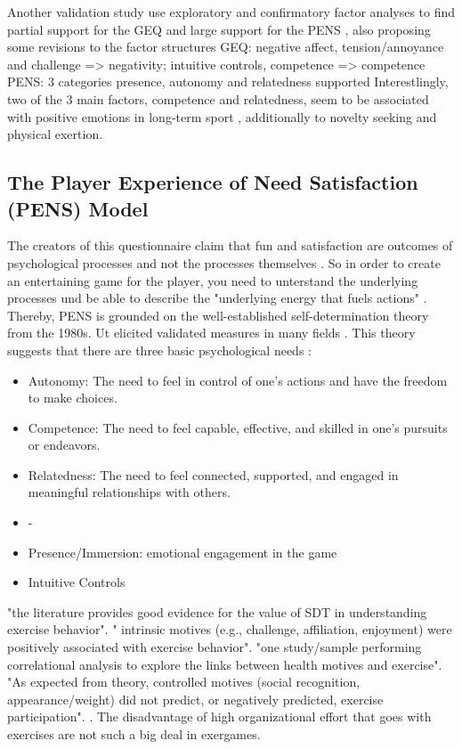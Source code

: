 Another validation study use exploratory and confirmatory factor analyses to find partial support for the GEQ and large support for the PENS \cite{johnson2018validation}, also proposing some revisions to the factor structures
GEQ: negative affect, tension/annoyance and challenge => negativity;
	intuitive controls, competence => competence
PENS: 3 categories presence, autonomy and relatedness supported
Interestlingly, two of the 3 main factors, competence and relatedness, seem to be associated with positive emotions in long-term sport \cite{wienke2016qualitative}, additionally to novelty seeking and physical exertion.


\subsection{The Player Experience of Need Satisfaction (PENS) Model}
The creators of this questionnaire claim that fun and satisfaction are outcomes of psychological processes and not the processes themselves \cite{rigby2007player}. So in order to create an entertaining game for the player, you need to unterstand the underlying processes und be able to describe the "underlying energy that fuels actions" \cite{rigby2007player}. Thereby, PENS is grounded on the well-established self-determination theory from the 1980s. Ut elicited validated measures in many fields \cite{pietrabissa2020development,lohmann2017measuring,richards2021further}. This theory suggests that there are three basic psychological needs \cite{deci1985intrinsic}:
\begin{itemize}
	\item Autonomy: The need to feel in control of one's actions and have the freedom to make choices.
	\item Competence: The need to feel capable, effective, and skilled in one's pursuits or endeavors.
	\item Relatedness: The need to feel connected, supported, and engaged in meaningful relationships with others.
	\item -
	\item Presence/Immersion: emotional engagement in the game
	\item Intuitive Controls
\end{itemize}
"the literature provides good evidence for the value of SDT in understanding exercise behavior". " intrinsic motives (e.g., challenge, affiliation, enjoyment) were positively associated with exercise behavior". "one study/sample performing correlational analysis to explore the links between health motives and exercise". "As expected from theory, controlled motives (social recognition, appearance/weight) did not predict, or negatively predicted, exercise participation". \cite{teixeira2012exercise}. The disadvantage of high organizational effort that goes with exercises \cite{mullan97variations} are not such a big deal in exergames.

